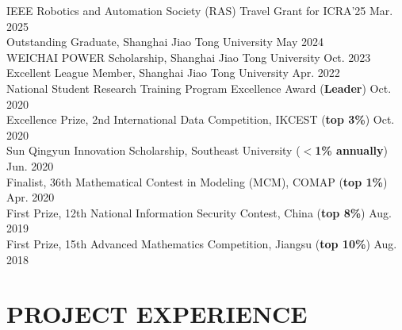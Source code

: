 \documentclass[letterpaper,11pt]{article}
\begin{document}
{{{{{{\begin{flushleft}
    \normalsize
    {IEEE Robotics and Automation Society (RAS) Travel Grant for ICRA'25 \cftdotfill{\cftdotsep}Mar. 2025}\\
    \vspace{1mm}
    {Outstanding Graduate, Shanghai Jiao Tong University \cftdotfill{\cftdotsep}May 2024}\\
    \vspace{1mm}
    {WEICHAI POWER Scholarship, Shanghai Jiao Tong University \cftdotfill{\cftdotsep}Oct. 2023}\\
    \vspace{1mm}
    {Excellent League Member, Shanghai Jiao Tong University \cftdotfill{\cftdotsep}Apr. 2022}\\
    \vspace{1mm}
    {National Student Research Training Program Excellence Award (\textbf{Leader}) \cftdotfill{\cftdotsep}Oct. 2020}\\
    \vspace{1mm}
    {Excellence Prize, 2nd International Data Competition, IKCEST (\textbf{top 3\%}) \cftdotfill{\cftdotsep}Oct. 2020}\\
    \vspace{1mm}
    {Sun Qingyun Innovation Scholarship, Southeast University (\textbf{$<$1\% annually}) \cftdotfill{\cftdotsep}Jun. 2020}\\
    \vspace{1mm}
    {Finalist, 36th Mathematical Contest in Modeling (MCM), COMAP (\textbf{top 1\%}) \cftdotfill{\cftdotsep}Apr. 2020}\\
    \vspace{1mm}
    {First Prize, 12th National Information Security Contest, China (\textbf{top 8\%}) \cftdotfill{\cftdotsep}Aug. 2019}\\
    \vspace{1mm}
    {First Prize, 15th Advanced Mathematics Competition, Jiangsu (\textbf{top 10\%}) \cftdotfill{\cftdotsep}Aug. 2018}
\end{flushleft}



\section{\textbf{PROJECT EXPERIENCE}}
\vspace{2mm}

}}}}}}
\end{document}
